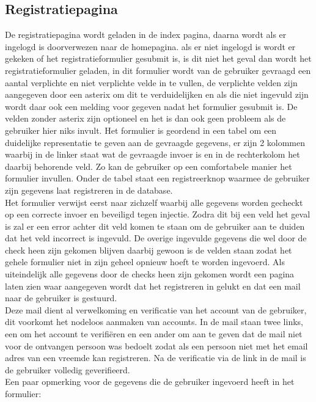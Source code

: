 \documentclass[a4paper,12pt]{article}
\begin{document}
\subsection[Registratiepagina]{Registratiepagina}
De registratiepagina wordt geladen in de index pagina, daarna wordt als er ingelogd is doorverwezen naar de homepagina. als er niet ingelogd is wordt er gekeken of het registratieformulier gesubmit is, is dit niet het geval dan wordt het registratieformulier geladen, in dit formulier wordt van de gebruiker gevraagd een aantal verplichte en niet verplichte velde in te vullen, de verplichte velden zijn aangegeven door een asterix om dit te verduidelijken en als die niet ingevuld zijn wordt daar ook een melding voor gegeven nadat het formulier gesubmit is. De velden zonder asterix zijn optioneel en het is dan ook geen probleem als de gebruiker hier niks invult. Het formulier is geordend in een tabel om een duidelijke representatie te geven aan de gevraagde gegevens, er zijn 2 kolommen waarbij in de linker staat wat de gevraagde invoer is en in de rechterkolom het daarbij behorende veld. Zo kan de gebruiker op een comfortabele manier het formulier invullen. Onder de tabel staat een registreerknop waarmee de gebruiker zijn gegevens laat registreren in de database. \\
Het formulier verwijst eerst naar zichzelf waarbij alle gegevens worden gecheckt op een correcte invoer en beveiligd tegen injectie. Zodra dit bij een veld het geval is zal er een error achter dit veld komen te staan om de gebruiker aan te duiden dat het veld incorrect is ingevuld. De overige ingevulde gegevens die wel door de check heen zijn gekomen blijven daarbij gewoon is de velden staan zodat het gehele formulier niet in zijn geheel opnieuw hoeft te worden ingevoerd. Als uiteindelijk alle gegevens door de checks heen zijn gekomen wordt een pagina laten zien waar aangegeven wordt dat het registreren in gelukt en dat een mail naar de gebruiker is gestuurd.\\
 Deze mail dient al verwelkoming en verificatie van het account van de gebruiker, dit voorkomt het nodeloos aanmaken van accounts. In de mail staan twee links, een om het account te verifiëren en een ander om aan te geven dat de mail niet voor de ontvangen persoon was bedoelt zodat als een persoon niet met het email adres van een vreemde kan registreren. Na de verificatie via de link in de mail is de gebruiker volledig geverifieerd.\\
Een paar opmerking voor de gegevens die de gebruiker ingevoerd heeft in het formulier:
\end{document}
